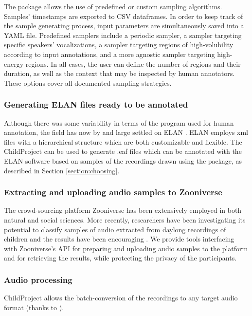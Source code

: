 \documentclass[smallextended]{svjour3}       %
\begin{document}
The package allows the use of predefined or custom sampling algorithms. Samples' timestamps are exported to CSV dataframes. In order to keep track of the sample generating process, input parameters are simultaneously saved into a YAML file. Predefined samplers include a periodic sampler, a sampler targeting specific speakers' vocalizations, a sampler targeting regions of high-volubility according to input annotations, and a more agnostic sampler targeting high-energy regions. In all cases, the user can define the number of regions and their duration, as well as the context that may be inspected by human annotators. These options cover all documented sampling strategies.

\subsubsection*{Generating ELAN files ready to be annotated}

Although there was some variability in terms of the program used for human annotation, the field has now by and large settled on ELAN \citep{wittenburg2006elan}. ELAN employs xml files with a hierarchical structure which are both customizable and flexible. The ChildProject can be used to generate .eaf files which can be annotated with the ELAN software based on samples of the recordings drawn using the package, as described in Section \ref{section:choosing}.

\subsubsection*{Extracting and uploading audio samples to Zooniverse}

The crowd-sourcing platform Zooniverse \citep{zooniverse} has been extensively employed in both natural \citep{gravityspy} and social sciences. More recently, researchers have been investigating its potential to classify samples of audio extracted from daylong recordings of children and the results have been encouraging  \citep{semenzin2020a,semenzin2020b}. We provide tools interfacing with Zooniverse's API for preparing and uploading audio samples to the platform and for retrieving the results, while protecting the privacy of the participants.

\subsubsection*{Audio processing}

ChildProject allows the batch-conversion of the recordings to any target audio format (thanks to \citealt{ffmpeg}).
\end{document}
